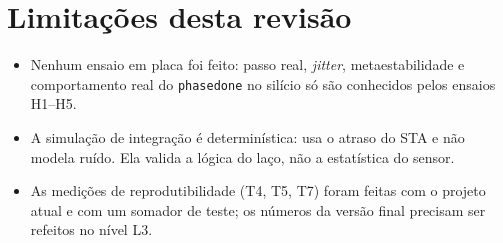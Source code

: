 \documentclass[11pt,a4paper]{article}
\begin{document}
\section{Limitações desta revisão}
\begin{itemize}
  \item Nenhum ensaio em placa foi feito: passo real, \emph{jitter}, metaestabilidade e
        comportamento real do \texttt{phasedone} no silício só são conhecidos pelos ensaios H1--H5.
  \item A simulação de integração é determinística: usa o atraso do STA e não modela ruído.
        Ela valida a lógica do laço, não a estatística do sensor.
  \item As medições de reprodutibilidade (T4, T5, T7) foram feitas com o projeto atual e com um
        somador de teste; os números da versão final precisam ser refeitos no nível L3.
\end{itemize}

\clearpage
\appendix

\end{document}
